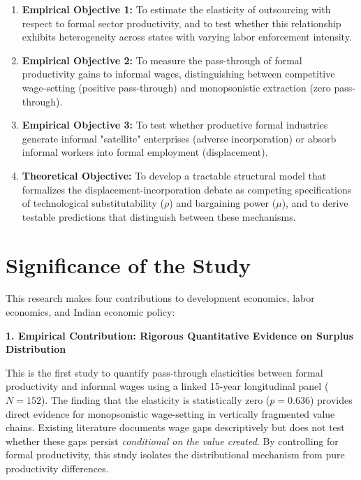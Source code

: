 \begin{enumerate}
	\item \textbf{Empirical Objective 1:} To estimate the elasticity of outsourcing with respect to formal sector productivity, and to test whether this relationship exhibits heterogeneity across states with varying labor enforcement intensity.
	
	\item \textbf{Empirical Objective 2:} To measure the pass-through of formal productivity gains to informal wages, distinguishing between competitive wage-setting (positive pass-through) and monopsonistic extraction (zero pass-through).
	
	\item \textbf{Empirical Objective 3:} To test whether productive formal industries generate informal "satellite" enterprises (adverse incorporation) or absorb informal workers into formal employment (displacement).
	
	\item \textbf{Theoretical Objective:} To develop a tractable structural model that formalizes the displacement-incorporation debate as competing specifications of technological substitutability ($\rho$) and bargaining power ($\mu$), and to derive testable predictions that distinguish between these mechanisms.


\end{enumerate}

\section{Significance of the Study}

This research makes four contributions to development economics, labor economics, and Indian economic policy:

\textbf{1. Empirical Contribution: Rigorous Quantitative Evidence on Surplus Distribution}

This is the first study to quantify pass-through elasticities between formal productivity and informal wages using a linked 15-year longitudinal panel ($N=152$). The finding that the elasticity is statistically zero ($p=0.636$) provides direct evidence for monopsonistic wage-setting in vertically fragmented value chains. Existing literature documents wage gaps descriptively \autocite{LaPorta2014} but does not test whether these gaps persist \textit{conditional on the value created}. By controlling for formal productivity, this study isolates the distributional mechanism from pure productivity differences.

